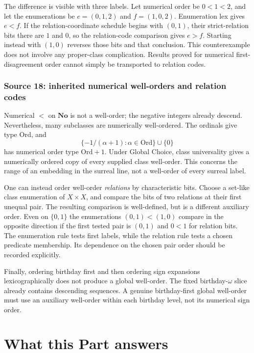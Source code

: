 \documentclass[11pt]{article}
\theoremstyle{definition}
\theoremstyle{remark}
\newcommand{\No}{\mathbf{No}}
\newcommand{\Ord}{\mathrm{Ord}}
\begin{document}
The difference is visible with three labels. Let numerical order be
$0<1<2$, and let the enumerations be $e=(0,1,2)$ and $f=(1,0,2)$.
Enumeration lex gives $e<f$. If the relation-coordinate schedule begins
with $(0,1)$, their strict-relation bits there are $1$ and $0$, so the
relation-code comparison gives $e>f$. Starting instead with $(1,0)$
reverses those bits and that conclusion. This counterexample does not
involve any proper-class complication. Results proved for numerical
first-disagreement order cannot simply be transported to relation codes.

\subsubsection{Source 18: inherited numerical well-orders and relation codes}

Numerical $<$ on $\No$ is not a well-order; the negative integers
already descend. Nevertheless, many subclasses are numerically
well-ordered. The ordinals give type $\Ord$, and
\[
 \{-1/(\alpha+1):\alpha\in\Ord\}\cup\{0\}
\]
has numerical order type $\Ord+1$. Under Global Choice, class
universality gives a numerically ordered copy of every supplied class
well-order. This concerns the range of an embedding in the surreal line,
not a well-order of every surreal label.

One can instead order well-order \emph{relations} by characteristic
bits. Choose a set-like class enumeration of $X\times X$, and compare
the bits of two relations at their first unequal pair. The resulting
comparison is well-defined, but is a different auxiliary order. Even
on $\{0,1\}$ the enumerations $(0,1)<(1,0)$ compare in the opposite
direction if the first tested pair is $(0,1)$ and $0<1$ for relation
bits. The enumeration rule tests first labels, while the relation rule
tests a chosen predicate membership. Its dependence on the chosen pair
order should be recorded explicitly.

Finally, ordering birthday first and then ordering sign expansions
lexicographically does not produce a global well-order. The fixed
birthday-$\omega$ slice already contains descending sequences. A
genuine birthday-first global well-order must use an auxiliary
well-order within each birthday level, not its numerical sign order.

\section{What this Part answers}\label{swo:vii:sec:status}
\end{document}
